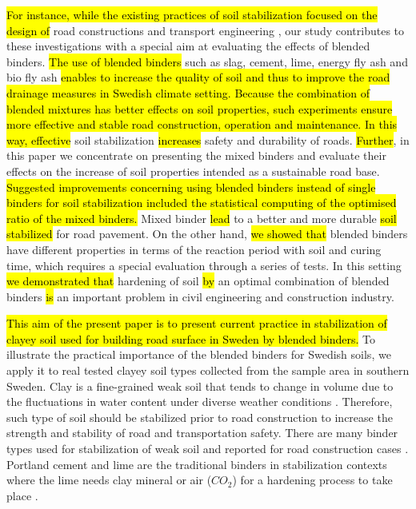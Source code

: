 \documentclass[constrmater,article,submit,pdftex,moreauthors]{Definitions/mdpi}
\begin{document}
\hl{For instance, while the existing practices of soil stabilization focused on the design of }road constructions and transport engineering \citep{Celauro,Glossop,Markwick,Nelson,Olsenetal2022,Sear}, our study contributes to these investigations with a special aim at evaluating the effects of blended binders. \hl{The use of blended binders }such as slag, cement, lime, energy fly ash and bio fly ash \hl{enables to increase the quality of soil and thus to improve the road drainage measures in Swedish climate setting. Because the combination of blended mixtures has better effects on soil properties, such experiments ensure more effective and stable road  construction, operation and maintenance. In this way, effective }soil stabilization \hl{increases} safety and durability of roads. \hl{Further}, in this paper we concentrate on presenting the mixed binders and evaluate their effects on the increase of soil properties intended as a sustainable road base. \hl{Suggested improvements concerning using blended binders instead of single binders for soil stabilization included the statistical computing of the optimised ratio of the mixed binders.} Mixed binder \hl{lead} to a better and more durable\hl{ soil stabilized} for road pavement. On the other hand, \hl{we showed that }blended binders have different properties in terms of the reaction period with soil and curing time, which requires a special evaluation through a series of tests. In this setting \hl{we demonstrated that }hardening of soil \hl{by} an optimal combination of blended binders \hl{is} an important problem in civil engineering and construction industry. 

\hl{This aim of the present paper is to present current practice in stabilization of clayey soil used for building road surface in Sweden by blended binders. }To illustrate the practical importance of the blended binders for Swedish soils, we apply it to real tested clayey soil types collected from the sample area in southern Sweden. Clay is a fine-grained weak soil that tends to change in volume due to the fluctuations in water content under diverse weather conditions \cite{Sudhakar}. Therefore, such type of soil should be stabilized prior to road construction to increase the strength and stability of road and transportation safety. There are many binder types used for stabilization of weak soil and reported for road construction cases \citep{Antunes,Park}. Portland cement and lime are the traditional binders in stabilization contexts where the lime needs clay mineral or air ($CO_2$) for a hardening process to take place \citep{Bell,Hilt,LindhLemenkovaCEE,Taylor}. 
\end{document}
